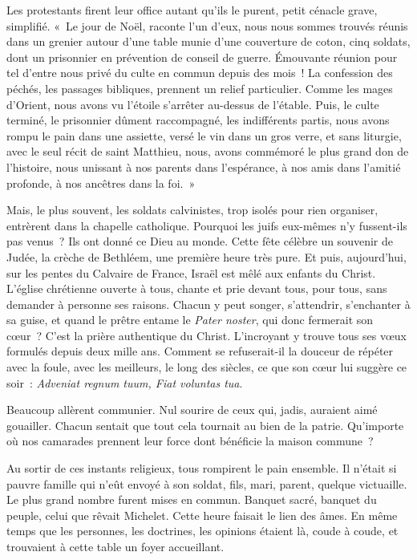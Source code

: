\documentclass[french,twoside]{book} %
\begin{document}
Les protestants firent leur office autant qu’ils le purent, petit cénacle grave, simplifié. « Le jour de Noël, raconte l’un d’eux, nous nous sommes trouvés réunis dans un grenier autour d’une table munie d’une couverture de coton, cinq soldats, dont un prisonnier en prévention de conseil de guerre. Émouvante réunion pour tel d’entre nous privé du culte en commun depuis des mois ! La confession des péchés, les passages bibliques, prennent un relief particulier. Comme les mages d’Orient, nous avons vu l’étoile s’arrêter au-dessus de l’étable. Puis, le culte terminé, le prisonnier dûment raccompagné, les indifférents partis, nous avons rompu le pain dans une assiette, versé le vin dans un gros verre, et sans liturgie, avec le seul récit de saint Matthieu, nous, avons commémoré le plus grand don de l’histoire, nous unissant à nos parents dans l’espérance, à nos amis dans l’amitié profonde, à nos ancêtres dans la foi. »‌\par
Mais, le plus souvent, les soldats calvinistes, trop isolés pour rien organiser, entrèrent dans la chapelle catholique. Pourquoi les juifs eux-mêmes n’y fussent-ils pas venus ? Ils ont donné ce Dieu au monde. Cette fête célèbre un souvenir de Judée, la crèche de Bethléem, une première heure très pure. Et puis, aujourd’hui, sur les pentes du Calvaire de France, Israël est mêlé aux enfants du Christ. L’église chrétienne ouverte à tous, chante et prie devant tous, pour tous, sans demander à personne ses raisons. Chacun y peut songer, s’attendrir, s’enchanter à sa guise, et quand le prêtre entame le {\itshape Pater noster}, qui donc fermerait son cœur ? C’est la prière authentique du Christ. L’incroyant y trouve tous ses vœux formulés depuis deux mille ans. Comment se refuserait-il la douceur de répéter avec la foule, avec les meilleurs, le long des siècles, ce que son cœur lui suggère ce soir : {\itshape Adveniat regnum tuum, Fiat voluntas tua}.‌\par
Beaucoup allèrent communier. Nul sourire de ceux qui, jadis, auraient aimé gouailler. Chacun sentait que tout cela tournait au bien de la patrie. Qu’importe où nos camarades prennent leur force dont bénéficie la maison commune ?‌\par
Au sortir de ces instants religieux, tous rompirent le pain ensemble. Il n’était si pauvre famille qui n’eût envoyé à son soldat, fils, mari, parent, quelque victuaille. Le plus grand nombre furent mises en commun. Banquet sacré, banquet du peuple, celui que rêvait Michelet. Cette heure faisait le lien des âmes. En même temps que les personnes, les doctrines, les opinions étaient là, coude à coude, et trouvaient à cette table un foyer accueillant.‌\par
\end{document}
